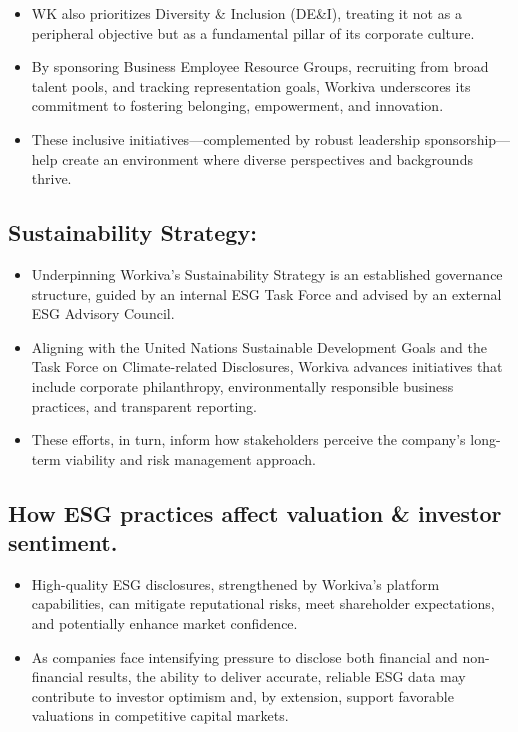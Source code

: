 \documentclass[
  10pt,
  a4paper,
]{article}
\providecommand{\tightlist}{%
  \setlength{\itemsep}{0pt}\setlength{\parskip}{0pt}}\usepackage{longtable,booktabs,array}
\begin{document}
\begin{itemize}
\tightlist
\item
  WK also prioritizes Diversity \& Inclusion (DE\&I), treating it not as
  a peripheral objective but as a fundamental pillar of its corporate
  culture.
\item
  By sponsoring Business Employee Resource Groups, recruiting from broad
  talent pools, and tracking representation goals, Workiva underscores
  its commitment to fostering belonging, empowerment, and innovation.
\item
  These inclusive initiatives---complemented by robust leadership
  sponsorship---help create an environment where diverse perspectives
  and backgrounds thrive.
\end{itemize}

\subsection{Sustainability Strategy:}\label{sustainability-strategy}

\begin{itemize}
\tightlist
\item
  Underpinning Workiva's Sustainability Strategy is an established
  governance structure, guided by an internal ESG Task Force and advised
  by an external ESG Advisory Council.
\item
  Aligning with the United Nations Sustainable Development Goals and the
  Task Force on Climate-related Disclosures, Workiva advances
  initiatives that include corporate philanthropy, environmentally
  responsible business practices, and transparent reporting.
\item
  These efforts, in turn, inform how stakeholders perceive the company's
  long-term viability and risk management approach.
\end{itemize}

\subsection{How ESG practices affect valuation \& investor
sentiment.}\label{how-esg-practices-affect-valuation-investor-sentiment.}

\begin{itemize}
\tightlist
\item
  High-quality ESG disclosures, strengthened by Workiva's platform
  capabilities, can mitigate reputational risks, meet shareholder
  expectations, and potentially enhance market confidence.
\item
  As companies face intensifying pressure to disclose both financial and
  non-financial results, the ability to deliver accurate, reliable ESG
  data may contribute to investor optimism and, by extension, support
  favorable valuations in competitive capital markets.
\end{itemize}
\end{document}
